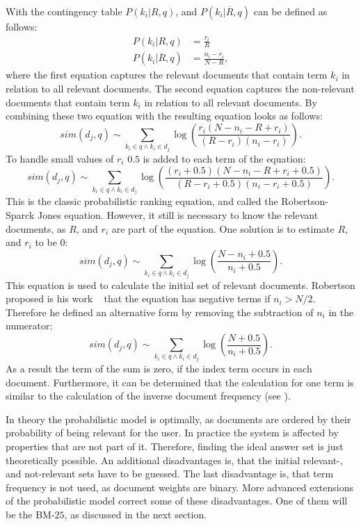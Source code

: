 With the contingency table $P(k_i|R, q)$, and $P(k_i|\overline{R}, q)$ can be defined as follows:
\begin{align}
  P(k_i|R, q) & = \frac{r_i}{R} \\
  P(k_i|\overline{R}, q) & = \frac{n_i - r_i}{N - R},
\end{align}
where the first equation captures the relevant documents that contain term $k_i$ in relation to all relevant documents. The second equation captures the non-relevant documents that contain term $k_i$ in relation to all relevant documents. By combining these two equation with  the resulting equation looks as follows:
\begin{equation}
  sim(d_{j}, q) \sim \sum_{k_i \in q \wedge k_i \in d_j} \log \left(\frac{r_i(N - n_i - R + r_i)}{(R - r_i)(n_i - r_i)}\right).
\end{equation}
To handle small values of $r_i$ $0.5$ is added to each term of the equation:
\begin{equation}
  sim(d_{j}, q) \sim \sum_{k_i \in q \wedge k_i \in d_j} \log \left(\frac{(r_i + 0.5)(N - n_i - R + r_i + 0.5)}{(R - r_i + 0.5)(n_i - r_i + 0.5)}\right).
\end{equation}
This is the classic probabilistic ranking equation, and called the Robertson-Sparck Jones equation. However, it still is necessary to know the relevant documents, as $R$, and $r_i$ are part of the equation. One solution is to estimate $R$, and $r_i$ to be $0$:
\begin{equation}
  \label{similarity_porbabilistic_no_relevant}
  sim(d_{j}, q) \sim \sum_{k_i \in q \wedge k_i \in d_j} \log \left(\frac{N - n_i + 0.5}{n_i + 0.5}\right).
\end{equation}
This equation is used to calculate the initial set of relevant documents. Robertson proposed is his work ~\cite{robertson04idf} that the equation has negative terms if $n_i > N/2$. Therefore he defined an alternative form by removing the subtraction of $n_i$ in the numerator:
\begin{equation}
  sim(d_{j}, q) \sim \sum_{k_i \in q \wedge k_i \in d_j} \log \left(\frac{N + 0.5}{n_i + 0.5}\right).
\end{equation}
As a result the term of the sum is zero, if the index term occurs in each document. Furthermore, it can be determined that the calculation for one term is similar to the calculation of the inverse document frequency (see ).

In theory the probabilistic model is optimally, as documents are ordered by their probability of being relevant for the user. In practice the system is affected by properties that are not part of it. Therefore, finding the ideal answer set is just theoretically possible. An additional disadvantages is, that the initial relevant-, and not-relevant sets have to be guessed. The last disadvantage is, that term frequency is not used, as document weights are binary. More advanced extensions of the probabilistic model correct some of these disadvantages. One of them will be the BM-$25$, as discussed in the next section.

